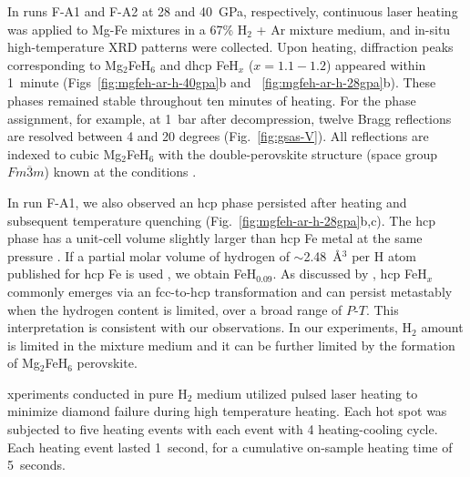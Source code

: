\documentclass[draft,jgrga,12pt]{agujournal2019}
\begin{document}
In runs F-A1 and F-A2 at 28 and 40~{GPa}, respectively, continuous laser heating was applied to Mg-Fe mixtures in a 67\% H$_2$ + Ar mixture medium, and in-situ high-temperature XRD patterns were collected. 
Upon heating, diffraction peaks corresponding to Mg$_2$FeH$_6$ and dhcp FeH$_x$ ($x =1.1{-}1.2$) appeared within 1~minute (Figs~\ref{fig:mgfeh-ar-h-40gpa}b and ~\ref{fig:mgfeh-ar-h-28gpa}b). 
These phases remained stable throughout ten minutes of heating. 
For the phase assignment, for example, at 1~bar after decompression, twelve Bragg reflections are resolved between 4 and 20 degrees (Fig.~\ref{fig:gsas-V}). 
All reflections are indexed  to cubic Mg$_2$FeH$_6$ with the double-perovskite structure (space group $Fm\overline{3}m$) known at the conditions \cite{didisheim_dimagnesium_1984, retuerto_highpressure_2010}. 

In run F-A1, we also observed an hcp phase persisted after heating and subsequent temperature quenching (Fig.~\ref{fig:mgfeh-ar-h-28gpa}b,c).
The hcp phase has a unit-cell volume slightly larger than hcp Fe metal at the same pressure \cite{dewaele_quasihydrostatic_2006}.
If a partial molar volume of hydrogen of $\sim$2.48~{\AA}$^3$ per H atom published for hcp Fe is used , we obtain FeH$_{0.09}$. 
As discussed by , hcp FeH$_x$ commonly emerges via an fcc-to-hcp transformation and can persist metastably when the hydrogen content is limited, over a broad range of $P$-$T$.
This interpretation is consistent with our observations.
In our experiments, H$_2$ amount is limited in the mixture medium and it can be further limited by the formation of Mg$_2$FeH$_6$ perovskite. 



xperiments conducted in  pure H$_2$ medium utilized pulsed laser heating to minimize diamond failure during high temperature heating.  %
Each hot spot was subjected to five heating events with each event with 4 heating-cooling cycle.
Each heating event lasted 1~second, for a cumulative on-sample heating time of 5~seconds. 
\end{document}
